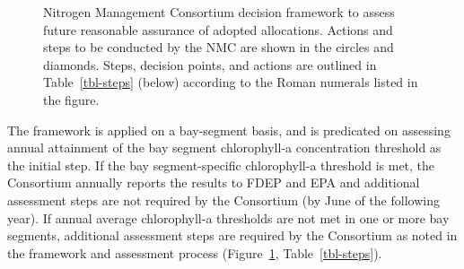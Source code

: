 \documentclass[
  letterpaper,
  DIV=11,
  numbers=noendperiod]{scrreport}
\begin{document}
\begin{figure}


\caption{\label{fig-decision}Nitrogen Management Consortium decision
framework to assess future reasonable assurance of adopted allocations.
Actions and steps to be conducted by the NMC are shown in the circles
and diamonds. Steps, decision points, and actions are outlined in
Table~\ref{tbl-steps} (below) according to the Roman numerals listed in
the figure.}

\end{figure}%

The framework is applied on a bay-segment basis, and is predicated on
assessing annual attainment of the bay segment chlorophyll-a
concentration threshold as the initial step. If the bay segment-specific
chlorophyll-a threshold is met, the Consortium annually reports the
results to FDEP and EPA and additional assessment steps are not required
by the Consortium (by June of the following year). If annual average
chlorophyll-a thresholds are not met in one or more bay segments,
additional assessment steps are required by the Consortium as noted in
the framework and assessment process (Figure~\ref{fig-decision},
Table~\ref{tbl-steps}).
\end{document}
